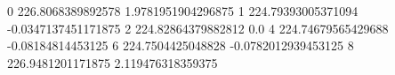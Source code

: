 0 226.8068389892578 1.9781951904296875
1 224.79393005371094 -0.0347137451171875
2 224.82864379882812 0.0
4 224.74679565429688 -0.08184814453125
6 224.7504425048828 -0.0782012939453125
8 226.9481201171875 2.119476318359375
